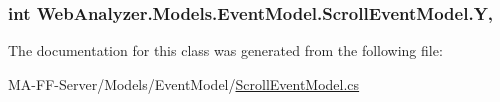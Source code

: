 \subsubsection[{Y}]{\setlength{\rightskip}{0pt plus 5cm}int Web\+Analyzer.\+Models.\+Event\+Model.\+Scroll\+Event\+Model.\+Y\hspace{0.3cm}{\ttfamily [get]}, {\ttfamily [set]}}\label{class_web_analyzer_1_1_models_1_1_event_model_1_1_scroll_event_model_a2247392c27cb5d65d023966dcf9a899d}


The documentation for this class was generated from the following file\+:\begin{DoxyCompactItemize}
\item 
M\+A-\/\+F\+F-\/\+Server/\+Models/\+Event\+Model/\hyperlink{_scroll_event_model_8cs}{Scroll\+Event\+Model.\+cs}\end{DoxyCompactItemize}
